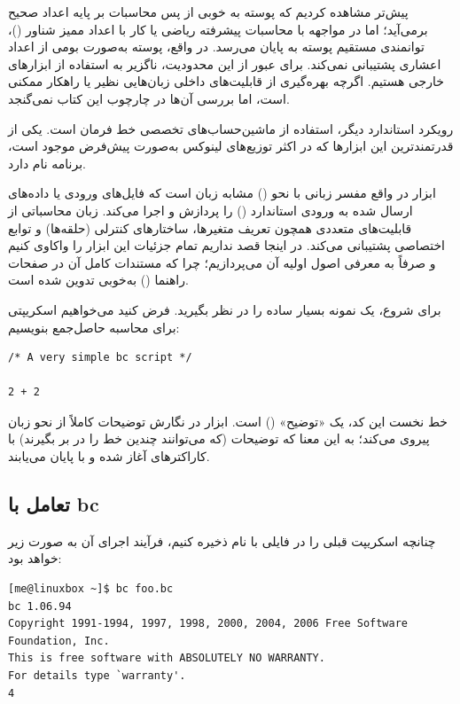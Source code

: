 پیش‌تر مشاهده کردیم که پوسته  به خوبی از پس محاسبات بر پایه اعداد صحیح برمی‌آید؛ اما در مواجهه با محاسبات پیشرفته ریاضی یا کار با اعداد ممیز شناور ()، توانمندی مستقیم پوسته به پایان می‌رسد. در واقع، پوسته به‌صورت بومی از اعداد اعشاری پشتیبانی نمی‌کند. برای عبور از این محدودیت، ناگزیر به استفاده از ابزارهای خارجی هستیم. اگرچه بهره‌گیری از قابلیت‌های داخلی زبان‌هایی نظیر  یا  راهکار ممکنی است، اما بررسی آن‌ها در چارچوب این کتاب نمی‌گنجد.

رویکرد استاندارد دیگر، استفاده از ماشین‌حساب‌های تخصصی خط فرمان است. یکی از قدرتمندترین این ابزارها که در اکثر توزیع‌های لینوکس به‌صورت پیش‌فرض موجود است، برنامه  نام دارد.

ابزار  در واقع مفسر زبانی با نحو () مشابه زبان  است که فایل‌های ورودی یا داده‌های ارسال شده به ورودی استاندارد () را پردازش و اجرا می‌کند. زبان محاسباتی  از قابلیت‌های متعددی همچون تعریف متغیرها، ساختارهای کنترلی (حلقه‌ها) و توابع اختصاصی پشتیبانی می‌کند. در اینجا قصد نداریم تمام جزئیات این ابزار را واکاوی کنیم و صرفاً به معرفی اصول اولیه آن می‌پردازیم؛ چرا که مستندات کامل آن در صفحات راهنما () به‌خوبی تدوین شده است.

برای شروع، یک نمونه بسیار ساده را در نظر بگیرید. فرض کنید می‌خواهیم اسکریپتی برای محاسبه حاصل‌جمع  بنویسیم:

\begin{latin}
\begin{lstlisting}
/* A very simple bc script */

2 + 2
\end{lstlisting}
\end{latin}

خط نخست این کد، یک «توضیح» () است. ابزار  در نگارش توضیحات کاملاً از نحو زبان  پیروی می‌کند؛ به این معنا که توضیحات (که می‌توانند چندین خط را در بر بگیرند) با کاراکترهای \cmd{/*} آغاز شده و با \cmd{*/} پایان می‌یابند.

\subsection{تعامل با bc}

چنانچه اسکریپت قبلی را در فایلی با نام  ذخیره کنیم، فرآیند اجرای آن به صورت زیر خواهد بود:

\begin{latin}
\begin{lstlisting}
[me@linuxbox ~]$ bc foo.bc
bc 1.06.94
Copyright 1991-1994, 1997, 1998, 2000, 2004, 2006 Free Software Foundation, Inc.
This is free software with ABSOLUTELY NO WARRANTY.
For details type `warranty'.
4
\end{lstlisting}
\end{latin}

